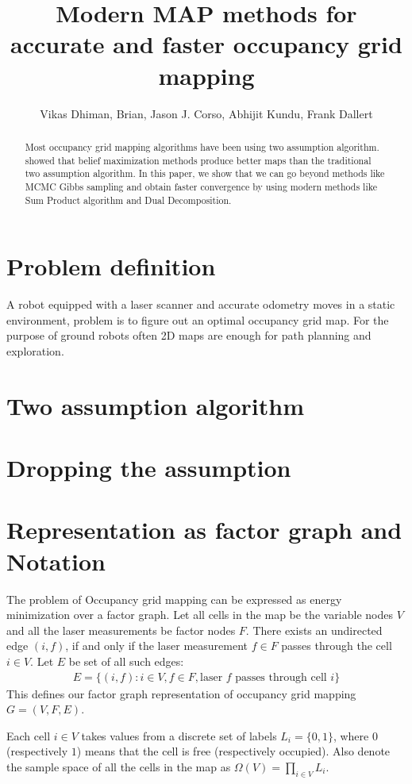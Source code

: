\documentclass[letterpaper, 10 pt, conference]{ieeeconf} %
\title{Modern MAP methods for accurate and faster occupancy grid mapping}
\author{Vikas Dhiman, Brian, Jason J. Corso, Abhijit Kundu, Frank Dallert}
\begin{document}
\maketitle
\begin{abstract}
  Most occupancy grid mapping algorithms have been using two assumption
  algorithm.  \cite{merali2013icra} showed that belief maximization methods
  produce better maps than the traditional two assumption algorithm.  In this
  paper, we show that we can go beyond methods like MCMC Gibbs sampling and
  obtain faster convergence by using modern methods like Sum Product algorithm
  and Dual Decomposition.
\end{abstract}
\section{Problem definition}
A robot equipped with a laser scanner and accurate odometry moves in a static
environment, problem is to figure out an optimal occupancy grid map. For the
purpose of ground robots often 2D maps are enough for path planning and
exploration. 
\section{Two assumption algorithm}
\section{Dropping the assumption}
\section{Representation as factor graph and Notation}
\label{sec:notation}
The problem of Occupancy grid mapping can be expressed as energy minimization
over a factor graph. Let all cells in the map be the variable nodes $V$ and all
the laser measurements be factor nodes $F$. 
There
exists an undirected edge $(i, f)$, if and only if the laser
measurement $f \in F$ passes through the cell $i \in V$. Let $E$ be set of all such edges:
\begin{align}
  E = \{(i, f) : i \in V, f \in F, \text{laser $f$ passes through cell $i$}\}
\end{align}
This defines our factor graph representation of occupancy grid mapping $G = (V, F, E)$.

%
%
Each cell $i \in V$ takes values
from a discrete set of labels $L_i = \{0, 1\}$, where $0$ (respectively $1$) means that
the cell is free (respectively occupied). Also denote the sample space of all the
cells in the map as $\Omega(V) = \prod_{i \in V} L_i$.
\end{document}

